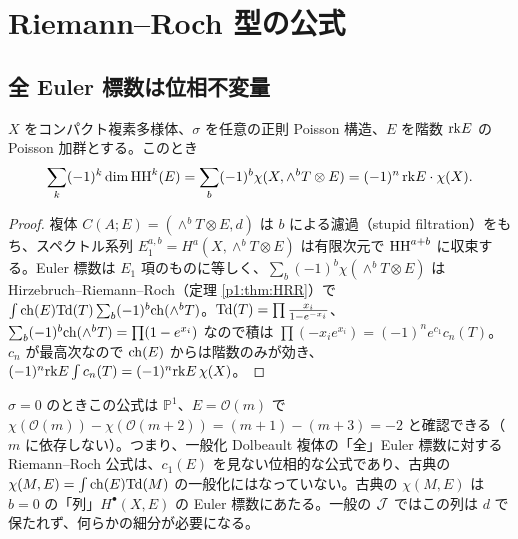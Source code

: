 \section{Riemann--Roch 型の公式}\label{p1:sec:RR}
\subsection{全 Euler 標数は位相不変量}
\begin{prop}\tP\label{p1:prop:euler}
$X$ をコンパクト複素多様体、$\sigma$ を任意の正則 Poisson 構造、$E$ を階数 $\mathrm{rk} E$ の Poisson 加群とする。このとき
\[\sum_k(-1)^k\dim\mathrm{HH}^k(E)=\sum_b(-1)^b\chi(X,\wedge^bT\otimes E)=(-1)^n\,\mathrm{rk} E\cdot\chi(X).\]
\end{prop}
\begin{proof}
複体 $C(A;E)=(\wedge^bT\otimes E,d)$ は $b$ による濾過（stupid filtration）をもち、スペクトル系列 $E_1^{a,b}=H^a(X,\wedge^bT\otimes E)$ は有限次元で $\mathrm{HH}^{a+b}$ に収束する。Euler 標数は $E_1$ 項のものに等しく、$\sum_b(-1)^b\chi(\wedge^bT\otimes E)$ は Hirzebruch--Riemann--Roch（定理 \ref{p1:thm:HRR}）で
$\int\mathrm{ch}(E)\mathrm{Td}(T)\sum_b(-1)^b\mathrm{ch}(\wedge^bT)$。$\mathrm{Td}(T)=\prod\frac{x_i}{1-e^{-x_i}}$、$\sum_b(-1)^b\mathrm{ch}(\wedge^bT)=\prod(1-e^{x_i})$ なので積は $\prod(-x_ie^{x_i})=(-1)^ne^{c_1}c_n(T)$。$c_n$ が最高次なので $\mathrm{ch}(E)$ からは階数のみが効き、$(-1)^n\mathrm{rk} E\int c_n(T)=(-1)^n\mathrm{rk} E\,\chi(X)$。\qedhere
\end{proof}
\begin{rem}[\tP\ 意味するところ]
$\sigma=0$ のときこの公式は $\mathbb{P}^1$、$E=\mathcal O(m)$ で $\chi(\mathcal O(m))-\chi(\mathcal O(m+2))=(m+1)-(m+3)=-2$ と確認できる（$m$ に依存しない）。つまり、一般化 Dolbeault 複体の「全」Euler 標数に対する Riemann--Roch 公式は、$c_1(E)$ を見ない位相的な公式であり、古典の $\chi(M,E)=\int\mathrm{ch}(E)\mathrm{Td}(M)$ の一般化にはなっていない。古典の $\chi(M,E)$ は $b=0$ の「列」$H^\bullet(X,E)$ の Euler 標数にあたる。一般の $\mathcal J$ ではこの列は $d$ で保たれず、何らかの細分が必要になる。
\end{rem}

